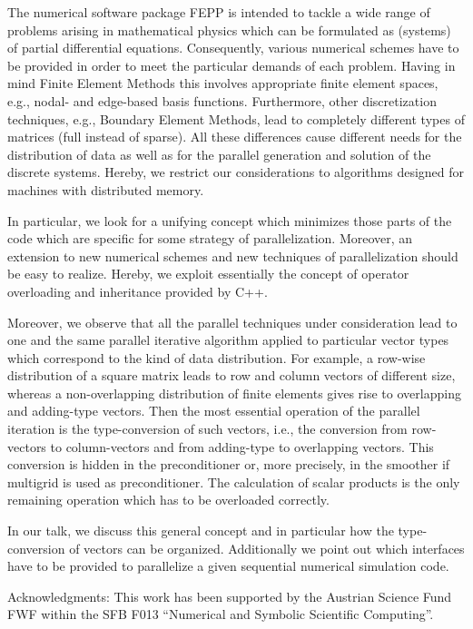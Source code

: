 \documentclass[11pt]{article}
\begin{document}
The numerical software package FEPP is intended to tackle a wide range
of problems arising in mathematical physics which can be formulated as
(systems) of partial differential equations. Consequently, various
numerical schemes have to be provided in order to meet the particular
demands of each problem. Having in mind Finite Element Methods this
involves appropriate finite element spaces, e.g., nodal- and edge-based
basis functions. Furthermore, other discretization techniques, e.g.,
Boundary Element Methods, lead to completely different types of
matrices (full instead of sparse). All these differences cause
different needs for the distribution of data as well as for the
parallel generation and solution of the discrete systems. Hereby, we
restrict our considerations to algorithms designed for machines with
distributed memory.

In particular, we look for a unifying concept which minimizes those
parts of the code which are specific for some strategy of
parallelization. Moreover, an extension to new numerical schemes and
new techniques of parallelization should be easy to realize. Hereby, we
exploit essentially the concept of operator overloading and inheritance
provided by C++.

Moreover, we observe that all the parallel techniques under
consideration lead to one and the same parallel iterative algorithm
applied to particular vector types which correspond to the kind of data
distribution. For example, a row-wise distribution of a square matrix
leads to row and column vectors of different size, whereas a
non-overlapping distribution of finite elements gives rise to
overlapping and adding-type vectors. Then the most essential operation
of the parallel iteration is the type-conversion of such vectors, i.e.,
the conversion from row-vectors to column-vectors and from adding-type
to overlapping vectors. This conversion is hidden in the preconditioner
or, more precisely, in the smoother if multigrid is used as
preconditioner. The calculation of scalar products is the only
remaining operation which has to be overloaded correctly.

In our talk, we discuss this general concept and in particular how the
type-conversion of vectors can be organized. Additionally we point out
which interfaces have to be provided to parallelize a given sequential
numerical simulation code.

Acknowledgments: This work has been supported by the Austrian Science
Fund FWF within the SFB F013
``Numerical and Symbolic Scientific Computing''.
\end{document}
